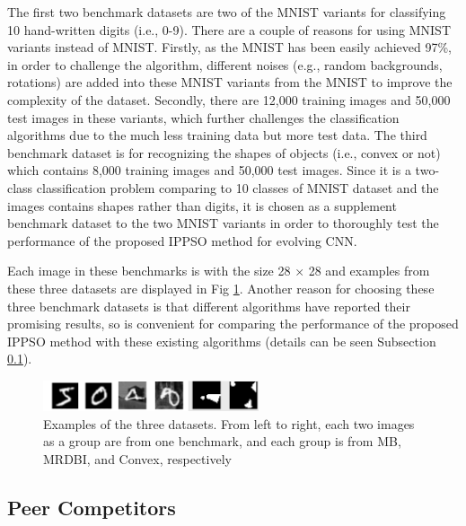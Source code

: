 \documentclass[conference]{IEEEtran}
\begin{document}
The first two benchmark datasets are two of the MNIST \cite{DocumentRecognition:LeCun} variants for classifying 10 hand-written digits (i.e., 0-9). There are a couple of reasons for using MNIST variants instead of MNIST. Firstly, as the MNIST has been easily achieved 97\%, in order to challenge the algorithm, different noises (e.g., random backgrounds, rotations) are added into these MNIST variants from the MNIST to improve the complexity of the dataset. Secondly, there are 12,000 training images and 50,000 test images in these variants, which further challenges the classification algorithms due to the much less training data but more test data. The third benchmark dataset is for recognizing the shapes of objects (i.e., convex or not) which contains 8,000 training images and 50,000 test images. Since it is a two-class classification problem comparing to 10 classes of MNIST dataset and the images contains shapes rather than digits, it is chosen as a supplement benchmark dataset to the two MNIST variants in order to thoroughly test the performance of the proposed IPPSO method for evolving CNN. 

Each image in these benchmarks is with the size 28 × 28 and examples from these three datasets are displayed in Fig \ref{fig:images}. Another reason for choosing these three benchmark datasets is that different algorithms have reported their promising results, so is convenient for comparing the performance of the proposed IPPSO method with these existing algorithms (details can be seen Subsection \ref{secpeer-competitors}).

\begin{figure}[!t]
	\centering
	\includegraphics[width=2.5in]{ippso_image_samples}
	\caption{Examples of the three datasets. From left to right, each two images as a group are from one benchmark, and each group is from MB, MRDBI, and Convex, respectively}
	\label{fig:images}
\end{figure}


\subsection{Peer Competitors}\label{secpeer-competitors}
\end{document}
